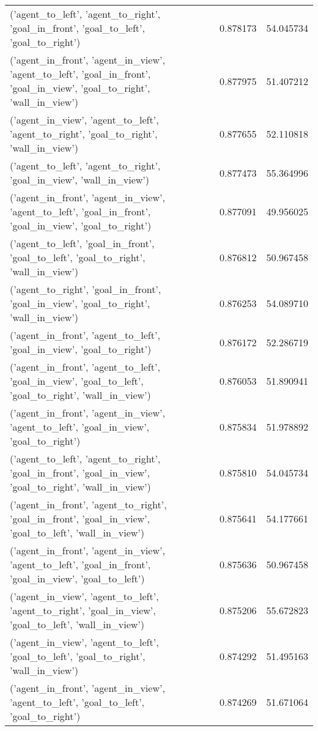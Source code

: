 \begin{tabular}{lrr}
('agent\_to\_left', 'agent\_to\_right', 'goal\_in\_front', 'goal\_to\_left', 'goal\_to\_right') & 0.878173 & 54.045734 \\
('agent\_in\_front', 'agent\_in\_view', 'agent\_to\_left', 'goal\_in\_front', 'goal\_in\_view', 'goal\_to\_right', 'wall\_in\_view') & 0.877975 & 51.407212 \\
('agent\_in\_view', 'agent\_to\_left', 'agent\_to\_right', 'goal\_to\_right', 'wall\_in\_view') & 0.877655 & 52.110818 \\
('agent\_to\_left', 'agent\_to\_right', 'goal\_in\_view', 'wall\_in\_view') & 0.877473 & 55.364996 \\
('agent\_in\_front', 'agent\_in\_view', 'agent\_to\_left', 'goal\_in\_front', 'goal\_in\_view', 'goal\_to\_right') & 0.877091 & 49.956025 \\
('agent\_to\_left', 'goal\_in\_front', 'goal\_to\_left', 'goal\_to\_right', 'wall\_in\_view') & 0.876812 & 50.967458 \\
('agent\_to\_right', 'goal\_in\_front', 'goal\_in\_view', 'goal\_to\_right', 'wall\_in\_view') & 0.876253 & 54.089710 \\
('agent\_in\_front', 'agent\_to\_left', 'goal\_in\_view', 'goal\_to\_right') & 0.876172 & 52.286719 \\
('agent\_in\_front', 'agent\_to\_left', 'goal\_in\_view', 'goal\_to\_left', 'goal\_to\_right', 'wall\_in\_view') & 0.876053 & 51.890941 \\
('agent\_in\_front', 'agent\_in\_view', 'agent\_to\_left', 'goal\_in\_view', 'goal\_to\_right') & 0.875834 & 51.978892 \\
('agent\_to\_left', 'agent\_to\_right', 'goal\_in\_front', 'goal\_in\_view', 'goal\_to\_right', 'wall\_in\_view') & 0.875810 & 54.045734 \\
('agent\_in\_front', 'agent\_to\_right', 'goal\_in\_front', 'goal\_in\_view', 'goal\_to\_left', 'wall\_in\_view') & 0.875641 & 54.177661 \\
('agent\_in\_front', 'agent\_in\_view', 'agent\_to\_left', 'goal\_in\_front', 'goal\_in\_view', 'goal\_to\_left') & 0.875636 & 50.967458 \\
('agent\_in\_view', 'agent\_to\_left', 'agent\_to\_right', 'goal\_in\_view', 'goal\_to\_left', 'wall\_in\_view') & 0.875206 & 55.672823 \\
('agent\_in\_view', 'agent\_to\_left', 'goal\_to\_left', 'goal\_to\_right', 'wall\_in\_view') & 0.874292 & 51.495163 \\
('agent\_in\_front', 'agent\_in\_view', 'agent\_to\_left', 'goal\_to\_left', 'goal\_to\_right') & 0.874269 & 51.671064 \\

\end{tabular}
